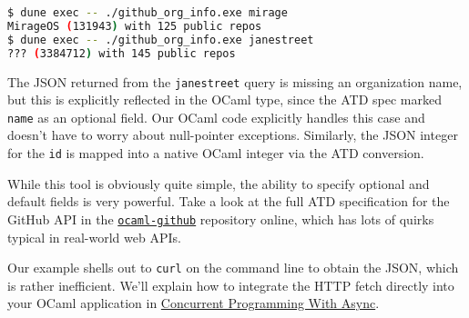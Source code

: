 \begin{lstlisting}[language=bash]
$ dune exec -- ./github_org_info.exe mirage
MirageOS (131943) with 125 public repos
$ dune exec -- ./github_org_info.exe janestreet
??? (3384712) with 145 public repos
\end{lstlisting}

The JSON returned from the \passthrough{\lstinline!janestreet!} query is
missing an organization name, but this is explicitly reflected in the
OCaml type, since the ATD spec marked \passthrough{\lstinline!name!} as
an optional field. Our OCaml code explicitly handles this case and
doesn't have to worry about null-pointer exceptions. Similarly, the JSON
integer for the \passthrough{\lstinline!id!} is mapped into a native
OCaml integer via the ATD conversion.

While this tool is obviously quite simple, the ability to specify
optional and default fields is very powerful. Take a look at the full
ATD specification for the GitHub API in the
\href{http://github.com/avsm/ocaml-github}{\passthrough{\lstinline!ocaml-github!}}
repository online, which has lots of quirks typical in real-world web
APIs. ~~~~

Our example shells out to \passthrough{\lstinline!curl!} on the command
line to obtain the JSON, which is rather inefficient. We'll explain how
to integrate the HTTP fetch directly into your OCaml application in
\href{concurrent-programming.html\#concurrent-programming-with-async}{Concurrent
Programming With Async}.

